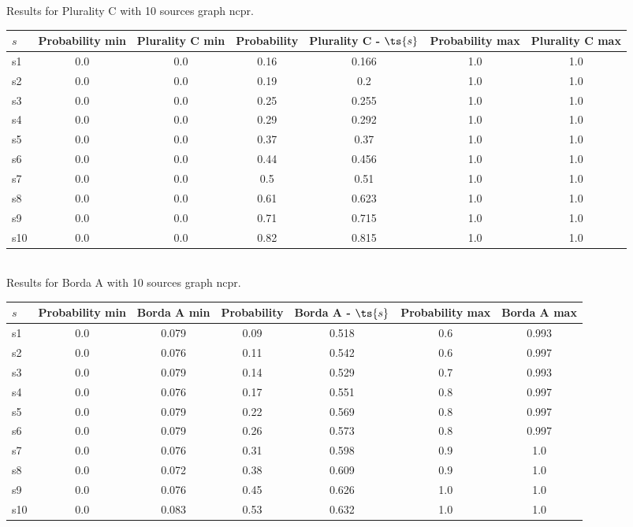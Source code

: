 \documentclass{article}
\begin{document}
\noindent Results for Plurality C with 10 sources graph ncpr.

\noindent\begin{tabular}{|l|c|c|c|c|c|c|}
\hline
$s$& Probability min & Plurality C min & Probability & Plurality C - $\ts{s}$ & Probability max & Plurality C max\\
\hline
s1 &0.0 & 0.0 & 0.16 & 0.166 & 1.0 & 1.0\\
\hline
s2 &0.0 & 0.0 & 0.19 & 0.2 & 1.0 & 1.0\\
\hline
s3 &0.0 & 0.0 & 0.25 & 0.255 & 1.0 & 1.0\\
\hline
s4 &0.0 & 0.0 & 0.29 & 0.292 & 1.0 & 1.0\\
\hline
s5 &0.0 & 0.0 & 0.37 & 0.37 & 1.0 & 1.0\\
\hline
s6 &0.0 & 0.0 & 0.44 & 0.456 & 1.0 & 1.0\\
\hline
s7 &0.0 & 0.0 & 0.5 & 0.51 & 1.0 & 1.0\\
\hline
s8 &0.0 & 0.0 & 0.61 & 0.623 & 1.0 & 1.0\\
\hline
s9 &0.0 & 0.0 & 0.71 & 0.715 & 1.0 & 1.0\\
\hline
s10 &0.0 & 0.0 & 0.82 & 0.815 & 1.0 & 1.0\\
\hline
\end{tabular}\\

\noindent Results for Borda A with 10 sources graph ncpr.

\noindent\begin{tabular}{|l|c|c|c|c|c|c|}
\hline
$s$& Probability min & Borda A min & Probability & Borda A - $\ts{s}$ & Probability max & Borda A max\\
\hline
s1 &0.0 & 0.079 & 0.09 & 0.518 & 0.6 & 0.993\\
\hline
s2 &0.0 & 0.076 & 0.11 & 0.542 & 0.6 & 0.997\\
\hline
s3 &0.0 & 0.079 & 0.14 & 0.529 & 0.7 & 0.993\\
\hline
s4 &0.0 & 0.076 & 0.17 & 0.551 & 0.8 & 0.997\\
\hline
s5 &0.0 & 0.079 & 0.22 & 0.569 & 0.8 & 0.997\\
\hline
s6 &0.0 & 0.079 & 0.26 & 0.573 & 0.8 & 0.997\\
\hline
s7 &0.0 & 0.076 & 0.31 & 0.598 & 0.9 & 1.0\\
\hline
s8 &0.0 & 0.072 & 0.38 & 0.609 & 0.9 & 1.0\\
\hline
s9 &0.0 & 0.076 & 0.45 & 0.626 & 1.0 & 1.0\\
\hline
s10 &0.0 & 0.083 & 0.53 & 0.632 & 1.0 & 1.0\\
\hline
\end{tabular}\\
\end{document}
